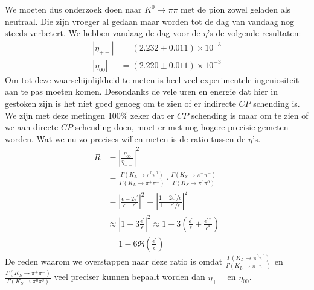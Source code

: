 \documentclass[../main.tex]{subfiles}
\begin{document}
We moeten dus onderzoek doen naar $K^{0} \rightarrow \pi \pi$ met de pion zowel geladen als neutraal. Die zijn vroeger al gedaan maar worden tot de dag van vandaag nog steeds verbetert. We hebben vandaag de dag voor de $\eta$'s de volgende resultaten:
\begin{equation}
    \begin{aligned}
        \label{eq:hedendaagse_eta}
        \left|\eta_{+-}\right| &=(2.232 \pm 0.011) \times 10^{-3} \\
        \left|\eta_{00}\right| &=(2.220 \pm 0.011) \times 10^{-3}
    \end{aligned}
\end{equation}
Om tot deze waarschijnlijkheid te meten is heel veel experimentele ingeniositeit aan te pas moeten komen. Desondanks de vele uren en energie dat hier in gestoken zijn is het niet goed genoeg om te zien of er indirecte $CP$ schending is. We zijn met deze metingen 100\% zeker dat er $CP$ schending is maar om te zien of we aan directe $CP$ schending doen, moet er met nog hogere precisie gemeten worden. Wat we nu zo precises willen meten is de ratio tussen de $\eta$'s.
\begin{equation}
    \begin{aligned}
        \label{eq:eta_ratio}
        R&=\left|\frac{\eta_{00}}{\eta_{+-}}\right|^{2}\\
         &=\frac{\Gamma\left(K_{L} \rightarrow \pi^{0} \pi^{0}\right)}{\Gamma\left(K_{L} \rightarrow \pi^{+} \pi^{-}\right)} \cdot \frac{\Gamma\left(K_{S} \rightarrow \pi^{+} \pi^{-}\right)}{\Gamma\left(K_{S} \rightarrow \pi^{0} \pi^{0}\right)} \\
         &=\left|\frac{\epsilon-2 \epsilon^{\prime}}{\epsilon+\epsilon^{\prime}}\right|^{2}=\left|\frac{1-2 \epsilon^{\prime} / \epsilon}{1+\epsilon^{\prime} / \epsilon}\right|^{2} \\
         &\approx\left|1-3 \frac{\epsilon^{\prime}}{\epsilon}\right|^{2} \approx 1-3\left(\frac{\epsilon^{\prime}}{\epsilon}+\frac{\epsilon^{\prime *}}{\epsilon^{*}}\right) \\
         &=1-6 \Re\left(\frac{\epsilon^{\prime}}{\epsilon}\right)
    \end{aligned}
\end{equation}
De reden waarom we overstappen naar deze ratio is omdat $\frac{\Gamma\left(K_{L} \rightarrow \pi^{0} \pi^{0}\right)}{\Gamma\left(K_{L} \rightarrow \pi^{+} \pi^{-}\right)}$ en $\frac{\Gamma\left(K_{S} \rightarrow \pi^{+} \pi^{-}\right)}{\Gamma\left(K_{S} \rightarrow \pi^{0} \pi^{0}\right)}$ veel preciser kunnen bepaalt worden dan $\eta_{+-}$ en $\eta_{00}$.\\
\end{document}
